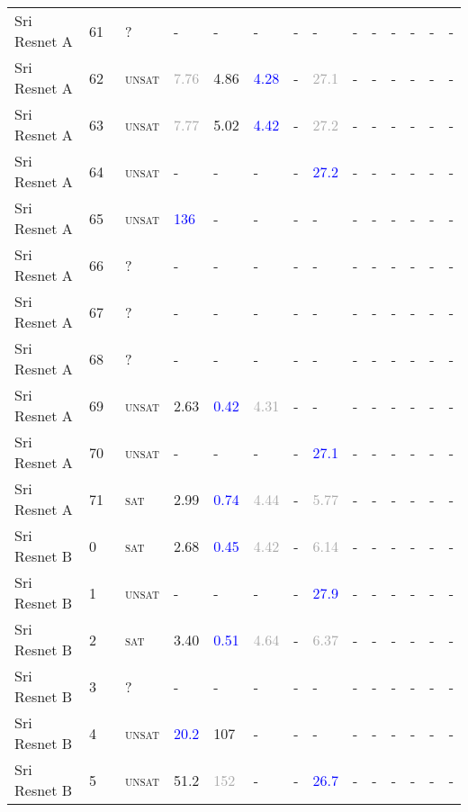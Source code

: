 \begin{center}
{\begin{longtable}{@{}llllllllllllll@{}}
Sri Resnet A & 61 & ~? & - & - & - & - & - & - & - & - & - & - & - \\
Sri Resnet A & 62 & ~\textsc{unsat} & \textcolor{darkgray}{7.76} & \textcolor{second}{4.86} & \textcolor{blue}{4.28} & - & \textcolor{darkgray}{27.1} & - & - & - & - & - & - \\
Sri Resnet A & 63 & ~\textsc{unsat} & \textcolor{darkgray}{7.77} & \textcolor{second}{5.02} & \textcolor{blue}{4.42} & - & \textcolor{darkgray}{27.2} & - & - & - & - & - & - \\
Sri Resnet A & 64 & ~\textsc{unsat} & - & - & - & - & \textcolor{blue}{27.2} & - & - & - & - & - & - \\
Sri Resnet A & 65 & ~\textsc{unsat} & \textcolor{blue}{136} & - & - & - & - & - & - & - & - & - & - \\
Sri Resnet A & 66 & ~? & - & - & - & - & - & - & - & - & - & - & - \\
Sri Resnet A & 67 & ~? & - & - & - & - & - & - & - & - & - & - & - \\
Sri Resnet A & 68 & ~? & - & - & - & - & - & - & - & - & - & - & - \\
Sri Resnet A & 69 & ~\textsc{unsat} & \textcolor{second}{2.63} & \textcolor{blue}{0.42} & \textcolor{darkgray}{4.31} & - & - & - & - & - & - & - & - \\
Sri Resnet A & 70 & ~\textsc{unsat} & - & - & - & - & \textcolor{blue}{27.1} & - & - & - & - & - & - \\
Sri Resnet A & 71 & ~\textsc{sat} & \textcolor{second}{2.99} & \textcolor{blue}{0.74} & \textcolor{darkgray}{4.44} & - & \textcolor{darkgray}{5.77} & - & - & - & - & - & - \\
\midrule
Sri Resnet B & 0 & ~\textsc{sat} & \textcolor{second}{2.68} & \textcolor{blue}{0.45} & \textcolor{darkgray}{4.42} & - & \textcolor{darkgray}{6.14} & - & - & - & - & - & - \\
Sri Resnet B & 1 & ~\textsc{unsat} & - & - & - & - & \textcolor{blue}{27.9} & - & - & - & - & - & - \\
Sri Resnet B & 2 & ~\textsc{sat} & \textcolor{second}{3.40} & \textcolor{blue}{0.51} & \textcolor{darkgray}{4.64} & - & \textcolor{darkgray}{6.37} & - & - & - & - & - & - \\
Sri Resnet B & 3 & ~? & - & - & - & - & - & - & - & - & - & - & - \\
Sri Resnet B & 4 & ~\textsc{unsat} & \textcolor{blue}{20.2} & \textcolor{second}{107} & - & - & - & - & - & - & - & - & - \\
Sri Resnet B & 5 & ~\textsc{unsat} & \textcolor{second}{51.2} & \textcolor{darkgray}{152} & - & - & \textcolor{blue}{26.7} & - & - & - & - & - & - \\

\end{longtable}}
\end{center}
